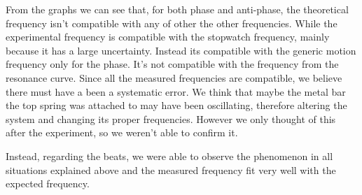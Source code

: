 \documentclass{article}
\begin{document}
From the graphs we can see that, for both phase and anti-phase, the theoretical frequency isn't compatible with any of other the other frequencies. While the experimental frequency is compatible with the stopwatch frequency, mainly because it has a large uncertainty. Instead its compatible with the generic motion frequency only for the phase. It's not compatible with the frequency from the resonance curve. Since all the measured frequencies are compatible, we believe  there must have a been a systematic error. We think that maybe the metal bar the top spring was attached to may have been oscillating, therefore altering the system and changing its proper frequencies. However we only thought of this after the experiment, so we weren't able to confirm it. 

Instead, regarding the beats, we were able to observe the phenomenon in all situations explained above and the measured frequency fit very well with the expected frequency.
\end{document}

